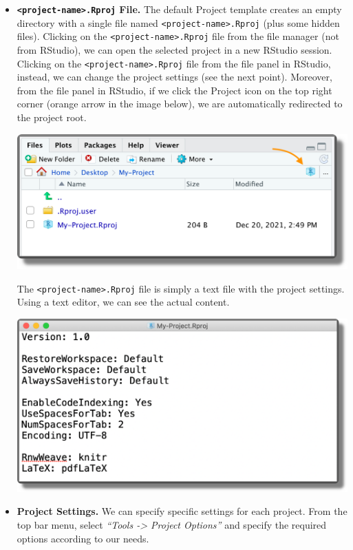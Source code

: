 \documentclass[
  11pt,
]{book}
\begin{document}
\begin{itemize}
\item
  \textbf{\texttt{\textless{}project-name\textgreater{}.Rproj} File.} The default Project template creates an empty directory with a single file named \texttt{\textless{}project-name\textgreater{}.Rproj} (plus some hidden files). Clicking on the \texttt{\textless{}project-name\textgreater{}.Rproj} file from the file manager (not from RStudio), we can open the selected project in a new RStudio session. Clicking on the \texttt{\textless{}project-name\textgreater{}.Rproj} file from the file panel in RStudio, instead, we can change the project settings (see the next point). Moreover, from the file panel in RStudio, if we click the Project icon on the top right corner (orange arrow in the image below), we are automatically redirected to the project root.

  \begin{center}\includegraphics[width=0.6\linewidth]{images/projects/proj-files} \end{center}

  The \texttt{\textless{}project-name\textgreater{}.Rproj} file is simply a text file with the project settings. Using a text editor, we can see the actual content.

  \begin{center}\includegraphics[width=0.6\linewidth]{images/projects/rproj-file} \end{center}
\item
  \textbf{Project Settings.} We can specify specific settings for each project. From the top bar menu, select \emph{``Tools -\textgreater{} Project Options''} and specify the required options according to our needs.


\end{itemize}
\end{document}
